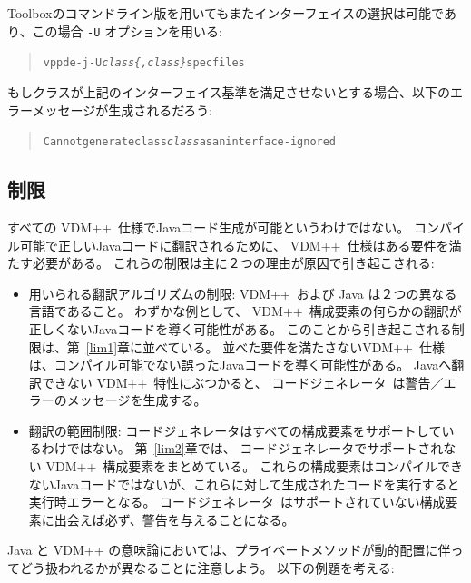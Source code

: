 \documentclass[\pformat,11pt]{jarticle}
\newcommand{\tcg}{コードジェネレータ}
\newcommand{\Tcg}{コードジェネレータ}
\newcommand{\VDM}{VDM++}
\begin{document}
Toolboxのコマンドライン版を用いてもまたインターフェイスの選択は可能であり、この場合 \texttt{-U} オプションを用いる:
\begin{quote}
\begin{alltt}
vppde -j -U \textit{class\{,class\}} specfiles
\end{alltt}
\end{quote}
もしクラスが上記のインターフェイス基準を満足させないとする場合、以下のエラーメッセージが生成されるだろう:
\begin{quote}
\begin{alltt}
Can not generate class \textit{class} as an interface - ignored
\end{alltt}
\end{quote}



\subsection{制限}\label{sec:unsupported}

すべての \VDM\ 仕様でJavaコード生成が可能というわけではない。
コンパイル可能で正しいJavaコードに翻訳されるために、 \VDM\ 仕様はある要件を満たす必要がある。
これらの制限は主に２つの理由が原因で引き起こされる:
\begin{itemize}
\item 用いられる翻訳アルゴリズムの制限: \VDM\ および Java は２つの異なる言語であること。
わずかな例として、 \VDM\ 構成要素の何らかの翻訳が正しくないJavaコードを導く可能性がある。
このことから引き起こされる制限は、第~\ref{lim1}章に並べている。
並べた要件を満たさない\VDM\ 仕様は、コンパイル可能でない誤ったJavaコードを導く可能性がある。
 Javaへ翻訳できない \VDM\ 特性にぶつかると、 \Tcg\ は警告／エラーのメッセージを生成する。
\item 翻訳の範囲制限:
コードジェネレータはすべての構成要素をサポートしているわけではない。
第~\ref{lim2}章では、 \tcg{}でサポートされない \VDM\ 構成要素をまとめている。
これらの構成要素はコンパイルできないJavaコードではないが、これらに対して生成されたコードを実行すると実行時エラーとなる。
\Tcg\ はサポートされていない構成要素に出会えば必ず、警告を与えることになる。
\end{itemize}
Java と VDM++ の意味論においては、プライベートメソッドが動的配置に伴ってどう扱われるかが異なることに注意しよう。
以下の例題を考える:
\end{document}
